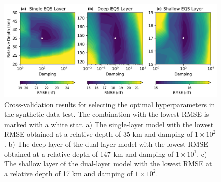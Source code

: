 \begin{figure}[tb!]
\centering
\includegraphics[width=1\linewidth]{paper/figures/cv_synthetic.png}
\caption{
    Cross-validation results for selecting the optimal hyperparameters in the synthetic data test. The combination with the lowest RMSE is marked with a white star. a) The single-layer model with the lowest RMSE obtained at a relative depth of 35 km and damping of $1 \times 10^2$. b) The deep layer of the dual-layer model with the lowest RMSE obtained at a relative depth of 147 km and damping of $1 \times 10^1$. c) The shallow layer of the dual-layer model with the lowest RMSE at a relative depth of 17 km and damping of $1 \times 10^2$.
}
\label{fig:cv_synthetic}
\end{figure}

